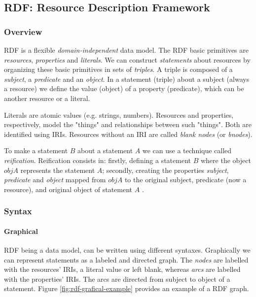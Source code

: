 \subsection{RDF: Resource Description Framework}
\label{ch2:sec:semantic-web:rdf}

\subsubsection{Overview}
\gls{RDF} \autocite{W3c_undated-vq} is a flexible \emph{domain-independent} data model. The \gls{RDF} basic primitives are \emph{resources}, \emph{properties} and \emph{literals}. We can construct \emph{statements} about resources by organizing these basic primitives in sets of \emph{triples}. A triple is composed of a \emph{subject}, a \emph{predicate} and an \emph{object}. In a statement (triple) about a subject (always a resource) we define the value (object) of a property (predicate), which can be another resource or a literal.

Literals are atomic values (e.g. strings, numbers). Resources and properties, respectively, model the "things" and relationships between such "things". Both are identified using \gls{IRI}s. Resources without an \gls{IRI} are called \emph{blank nodes} (or \emph{bnodes}).

To make a statement $B$ about a statement $A$ we can use a technique called \emph{reification}. Reification consists in: firstly, defining a statement $B$ where the object $objA$ represents the statement $A$; secondly, creating the properties \emph{subject}, \emph{predicate} and \emph{object} mapped from $objA$ to the original subject, predicate (now a resource), and original object of statement $A$ \autocite{Antoniou2012-nj}.

\subsubsection{Syntax}

\paragraph{Graphical} \gls{RDF} being a data model, can be written using different syntaxes. Graphically we can represent statements as a labeled and directed graph. The \emph{nodes} are labelled with the resources' \gls{IRI}s, a literal value or left blank, whereas \emph{arcs} are labelled with the properties' \gls{IRI}s. The arcs are directed from subject to object of a statement. Figure \ref{fig:rdf-grafical-example} provides an example of a \gls{RDF} graph.


